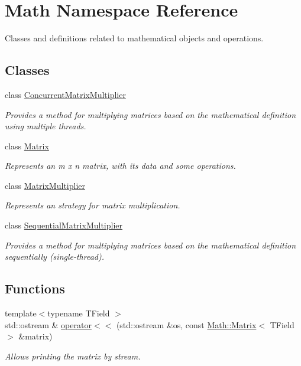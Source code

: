 \hypertarget{namespaceMath}{}\section{Math Namespace Reference}
\label{namespaceMath}


Classes and definitions related to mathematical objects and operations.  


\subsection*{Classes}
\begin{DoxyCompactItemize}
\item 
class \mbox{\hyperlink{classMath_1_1ConcurrentMatrixMultiplier}{Concurrent\+Matrix\+Multiplier}}
\begin{DoxyCompactList}\small\item\em Provides a method for multiplying matrices based on the mathematical definition using multiple threads. \end{DoxyCompactList}\item 
class \mbox{\hyperlink{classMath_1_1Matrix}{Matrix}}
\begin{DoxyCompactList}\small\item\em Represents an m x n matrix, with its data and some operations. \end{DoxyCompactList}\item 
class \mbox{\hyperlink{classMath_1_1MatrixMultiplier}{Matrix\+Multiplier}}
\begin{DoxyCompactList}\small\item\em Represents an strategy for matrix multiplication. \end{DoxyCompactList}\item 
class \mbox{\hyperlink{classMath_1_1SequentialMatrixMultiplier}{Sequential\+Matrix\+Multiplier}}
\begin{DoxyCompactList}\small\item\em Provides a method for multiplying matrices based on the mathematical definition sequentially (single-\/thread). \end{DoxyCompactList}\end{DoxyCompactItemize}
\subsection*{Functions}
\begin{DoxyCompactItemize}
\item 
{\footnotesize template$<$typename T\+Field $>$ }\\std\+::ostream \& \mbox{\hyperlink{namespaceMath_a03def80e3e35c7171610f7af0390032f}{operator$<$$<$}} (std\+::ostream \&os, const \mbox{\hyperlink{classMath_1_1Matrix}{Math\+::\+Matrix}}$<$ T\+Field $>$ \&matrix)
\begin{DoxyCompactList}\small\item\em Allows printing the matrix by stream. \end{DoxyCompactList}\end{DoxyCompactItemize}


